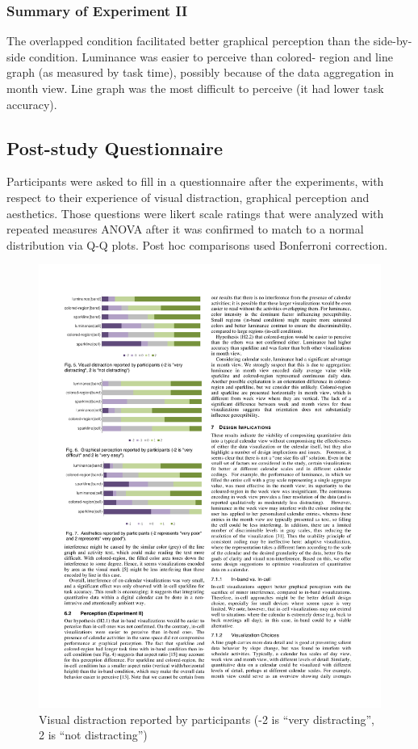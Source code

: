 \documentclass[12pt,oneside]{book}
\begin{document}
\subsubsection{Summary of Experiment II}
The overlapped condition facilitated better graphical perception than the side-by-side condition. Luminance was easier to perceive than colored- region and line graph (as measured by task time), possibly because of the data aggregation in month view. Line graph was the most difficult to perceive (it had lower task accuracy).


\subsection{Post-study Questionnaire}
Participants were asked to fill in a questionnaire after the experiments, with respect to their experience of visual distraction, graphical perception and aesthetics. Those questions were likert scale ratings that were analyzed with repeated measures ANOVA after it was confirmed to match to a normal distribution via Q-Q plots. Post hoc comparisons used Bonferroni correction.

\begin{figure}
\centering
\includegraphics[width=\columnwidth]{figures/rating_distraction}
\caption{ Visual distraction reported by participants (-2 is ``very distracting'', 2 is ``not distracting'')}
\label{fig:rating_distraction}
\end{figure}
\end{document}
